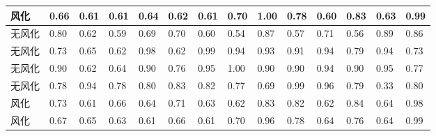 \documentclass[UTF8]{ctexart}
\begin{document}
\begin{table}[!ht]
\begin{tabular}{|l|l|l|l|l|l|l|l|l|l|l|l|l|l|}
        风化 & 0.66  & 0.61  & 0.61  & 0.64  & 0.62  & 0.61  & 0.70  & 1.00  & 0.78  & 0.60  & 0.83  & 0.63  & 0.99  \\ \hline
        无风化 & 0.80  & 0.62  & 0.59  & 0.69  & 0.70  & 0.60  & 0.54  & 0.87  & 0.57  & 0.71  & 0.56  & 0.89  & 0.86  \\ \hline
        无风化 & 0.73  & 0.65  & 0.62  & 0.98  & 0.62  & 0.99  & 0.94  & 0.93  & 0.91  & 0.94  & 0.79  & 0.94  & 0.73  \\ \hline
        无风化 & 0.90  & 0.62  & 0.64  & 0.90  & 0.76  & 0.95  & 1.00  & 0.90  & 0.90  & 0.94  & 0.90  & 0.95  & 0.77  \\ \hline
        无风化 & 0.78  & 0.94  & 0.78  & 0.80  & 0.83  & 0.82  & 0.77  & 0.69  & 0.99  & 0.96  & 0.79  & 0.33  & 0.80  \\ \hline
        风化 & 0.73  & 0.61  & 0.66  & 0.64  & 0.71  & 0.63  & 0.62  & 0.83  & 0.82  & 0.62  & 0.84  & 0.64  & 0.98  \\ \hline
        风化 & 0.67  & 0.65  & 0.63  & 0.61  & 0.66  & 0.61  & 0.70  & 0.96  & 0.78  & 0.64  & 0.76  & 0.64  & 0.99  \\ \hline
    \end{tabular}
\end{table}
\end{document}
